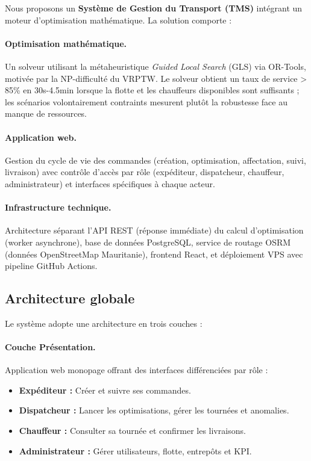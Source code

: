 \documentclass[12pt,a4paper]{report}
\begin{document}
Nous proposons un \textbf{Système de Gestion du Transport (TMS)} intégrant un moteur d'optimisation mathématique. La solution comporte :

\paragraph{Optimisation mathématique.} Un solveur utilisant la métaheuristique \textit{Guided Local Search} (GLS) via OR-Tools, motivée par la NP-difficulté du VRPTW. Le solveur obtient un taux de service > 85\% en 30s-4.5min lorsque la flotte et les chauffeurs disponibles sont suffisants ; les scénarios volontairement contraints mesurent plutôt la robustesse face au manque de ressources.

\paragraph{Application web.} Gestion du cycle de vie des commandes (création, optimisation, affectation, suivi, livraison) avec contrôle d'accès par rôle (expéditeur, dispatcheur, chauffeur, administrateur) et interfaces spécifiques à chaque acteur.

\paragraph{Infrastructure technique.} Architecture séparant l'API REST (réponse immédiate) du calcul d'optimisation (worker asynchrone), base de données PostgreSQL, service de routage OSRM (données OpenStreetMap Mauritanie), frontend React, et déploiement VPS avec pipeline GitHub Actions.

\subsection{Architecture globale}

Le système adopte une architecture en trois couches :

\paragraph{Couche Présentation.} Application web monopage offrant des interfaces différenciées par rôle :

\begin{itemize}[leftmargin=2.2em]
    \item \textbf{Expéditeur :} Créer et suivre ses commandes.

    \item \textbf{Dispatcheur :} Lancer les optimisations, gérer les tournées et anomalies.

    \item \textbf{Chauffeur :} Consulter sa tournée et confirmer les livraisons.

    \item \textbf{Administrateur :} Gérer utilisateurs, flotte, entrepôts et KPI.
\end{itemize}
\end{document}
